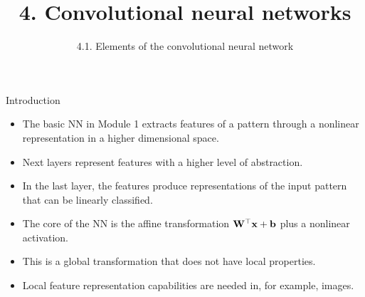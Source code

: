 \documentclass{beamer}
\title{4. Convolutional neural networks}
\subtitle{4.1. Elements of the convolutional neural network}
\begin{document}
\maketitle

\begin{frame}{Introduction}
\begin{itemize}
    \item The basic NN in Module 1 extracts features of a pattern through a nonlinear representation in a higher dimensional space. 
    \item Next layers represent features with a higher level of abstraction.
    \item In the last layer, the features produce representations of the input pattern that can be linearly classified. 

    \item The core of the NN is the affine transformation ${\bf W}^\top {\bf x} +{\bf b}$ plus a nonlinear activation. 

    \item This is a global transformation that does not have local properties. 

    \item Local feature representation capabilities are needed in, for example, images. 
\end{itemize}
\end{frame}
\end{document}
